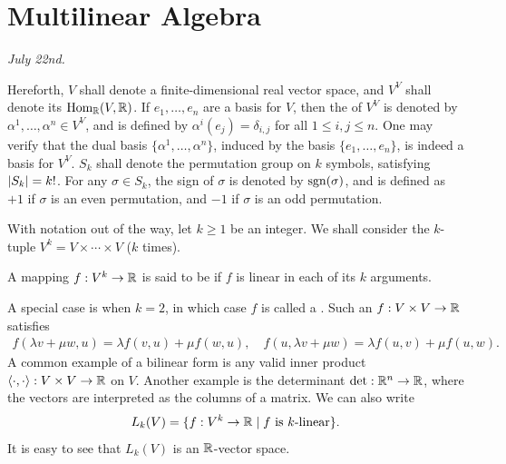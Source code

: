 \section{Multilinear Algebra}

\textit{July 22nd.}

Hereforth, $V$ shall denote a finite-dimensional real vector space, and $V^{V}$ shall denote its  $\operatorname{Hom}_{\mathbb{R}}(V,\mathbb{R})$. If $e_{1},\ldots,e_{n}$ are a basis for $V$, then the  of $V^{V}$ is denoted by $\alpha^{1},\ldots,\alpha^{n} \in V^{V}$, and is defined by $\alpha^{i}(e_{j}) = \delta_{i,j}$ for all $1 \leq i,j \leq n$. One may verify that the dual basis $\{\alpha^{1},\ldots,\alpha^{n}\}$, induced by the basis $\{e_{1},\ldots,e_{n}\}$, is indeed a basis for $V^{V}$. $S_{k}$ shall denote the permutation group on $k$ symbols, satisfying $\left| S_{k} \right| = k!$. For any $\sigma \in S_{k}$, the sign of $\sigma$ is denoted by $\operatorname{sgn}(\sigma)$, and is defined as $+1$ if $\sigma$ is an even permutation, and $-1$ if $\sigma$ is an odd permutation. 

With notation out of the way, let $k \geq 1$ be an integer. We shall consider the $k$-tuple $V^{k} = V \times \cdots \times V$ ($k$ times).

\begin{definition}
    A mapping $f:V^{k} \to \mathbb{R}$ is said to be  if $f$ is linear in each of its $k$ arguments.
\end{definition}
A special case is when $k = 2$, in which case $f$ is called a . Such an $f:V \times V \to \mathbb{R}$ satisfies
\begin{align}
    f(\lambda v + \mu w, u) = \lambda f(v,u) + \mu f(w,u), \quad f(u,\lambda v + \mu w) = \lambda f(u,v) + \mu f(u,w).
\end{align}
A common example of a bilinear form is any valid inner product $\langle\cdot,\cdot\rangle:V \times V \to \mathbb{R}$ on $V$. Another example is the determinant $\det:\mathbb{R}^{n} \to \mathbb{R}$, where the vectors are interpreted as the columns of a matrix. We can also write
\begin{align}
    L_{k}(V) = \{f:V^{k} \to \mathbb{R} \mid f \text{ is $k$-linear}\}.
\end{align}
It is easy to see that $L_{k}(V)$ is an $\mathbb{R}$-vector space.

